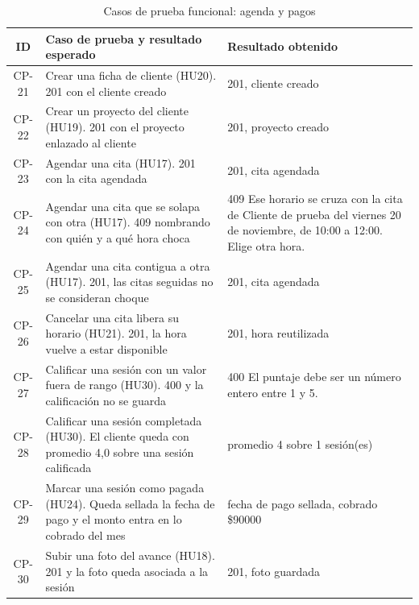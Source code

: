 \begin{table}[H]
  \centering
  \caption{Casos de prueba funcional: agenda y pagos}
  \label{tab:casosagenda}
  \renewcommand{\arraystretch}{1.2}
  \footnotesize
  \begin{tabular}{|c|p{5.9cm}|p{5.3cm}|}
    \hline
    \textbf{ID} & \textbf{Caso de prueba y resultado esperado} & \textbf{Resultado obtenido} \\
    \hline
    CP-21 & Crear una ficha de cliente (HU20). 201 con el cliente creado & 201, cliente creado \\ \hline
    CP-22 & Crear un proyecto del cliente (HU19). 201 con el proyecto enlazado al cliente & 201, proyecto creado \\ \hline
    CP-23 & Agendar una cita (HU17). 201 con la cita agendada & 201, cita agendada \\ \hline
    CP-24 & Agendar una cita que se solapa con otra (HU17). 409 nombrando con quién y a qué hora choca & 409 Ese horario se cruza con la cita de Cliente de prueba del viernes 20 de noviembre, de 10:00 a 12:00. Elige otra hora. \\ \hline
    CP-25 & Agendar una cita contigua a otra (HU17). 201, las citas seguidas no se consideran choque & 201, cita agendada \\ \hline
    CP-26 & Cancelar una cita libera su horario (HU21). 201, la hora vuelve a estar disponible & 201, hora reutilizada \\ \hline
    CP-27 & Calificar una sesión con un valor fuera de rango (HU30). 400 y la calificación no se guarda & 400 El puntaje debe ser un número entero entre 1 y 5. \\ \hline
    CP-28 & Calificar una sesión completada (HU30). El cliente queda con promedio 4,0 sobre una sesión calificada & promedio 4 sobre 1 sesión(es) \\ \hline
    CP-29 & Marcar una sesión como pagada (HU24). Queda sellada la fecha de pago y el monto entra en lo cobrado del mes & fecha de pago sellada, cobrado \$90000 \\ \hline
    CP-30 & Subir una foto del avance (HU18). 201 y la foto queda asociada a la sesión & 201, foto guardada \\ \hline
  \end{tabular}
\end{table}

